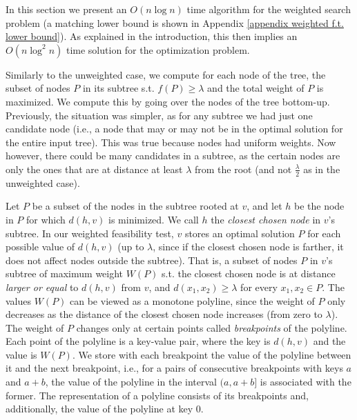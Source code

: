 \documentclass[a4paper,UKenglish]{lipics-v2016}
\theoremstyle{plain}
\begin{document}
In this section we present an $O(n\log n)$ time algorithm for the weighted search problem (a matching lower bound is shown in Appendix \ref{appendix weighted f.t. lower bound}).
As explained in the introduction, this then implies an $O(n\log^{2}n)$ time solution for the optimization problem.

Similarly to the unweighted case, we compute for each node of the tree, the subset of nodes $P$ in its subtree  s.t. $f(P) \geq \lambda$ and the total  weight of  $P$ is maximized. We compute this by going over the nodes of the tree bottom-up. Previously, the situation was simpler, as for any subtree we had just one candidate node (i.e., a node that may or may not be in the optimal solution for the entire input tree). This was true because nodes had uniform weights. Now however, there could be many candidates in a subtree, as the certain nodes are only the ones that are at distance at least $\lambda$ from the root (and not $\frac{\lambda}{2}$ as in the unweighted case).

Let $P$ be a subset of the nodes in the subtree rooted at $v$, and let $h$ be the node in $P$ for which $d(h,v)$ is minimized. We call $h$ the {\em closest chosen node} in $v$'s subtree. In our weighted feasibility test, $v$ stores an optimal solution $P$ for each possible value of $d(h,v)$ (up to $\lambda$, since if the closest chosen node is farther, it does not affect nodes outside the subtree). That is, a subset of nodes $P$ in $v$'s subtree of maximum weight $W(P)$ s.t. the closest chosen node is at distance {\em larger or equal} to $d(h,v)$ from $v$, and $d(x_1,x_2) \geq \lambda$ for every  $x_1,x_2\in P$. 
The values $W(P)$ can be viewed as a monotone polyline, since the weight of $P$ only decreases as the distance of the closest chosen node increases (from zero to $\lambda$). The weight of $P$ changes only at certain points called {\em breakpoints} of the polyline. Each point of the polyline is a key-value pair, where the key is $d(h,v)$ and the value is $W(P)$. We store with each breakpoint the value of the polyline between it and the next breakpoint,
i.e., for a pairs of consecutive breakpoints with keys $a$ and $a+b$, the value of the polyline in the interval $(a,a+b]$ is associated with the former.
The representation of a polyline consists of its breakpoints and, additionally, the value of the polyline at key 0.

\end{document}
